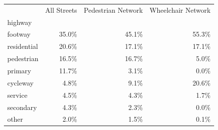 \begin{center}
\begin{tabular}{|l|r|r|r|}
\hline
 & All Streets & Pedestrian Network & Wheelchair Network \\
highway &  &  &  \\
\hline
footway & 35.0\% & 45.1\% & 55.3\% \\
residential & 20.6\% & 17.1\% & 17.1\% \\
pedestrian & 16.5\% & 16.7\% & 5.0\% \\
primary & 11.7\% & 3.1\% & 0.0\% \\
cycleway & 4.8\% & 9.1\% & 20.6\% \\
service & 4.5\% & 4.3\% & 1.7\% \\
secondary & 4.3\% & 2.3\% & 0.0\% \\
other & 2.0\% & 1.5\% & 0.1\% \\
\hline
\end{tabular}
\end{center}